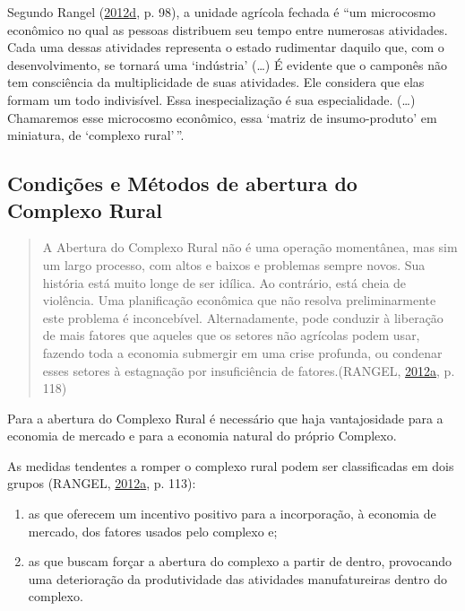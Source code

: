 \documentclass[a4paper, 12pt]{article}
\begin{document}
Segundo Rangel
(\protect\hyperlink{ref-rangel1956}{2012}\protect\hyperlink{ref-rangel1956}{d},
p. 98), a unidade agrícola fechada é ``um microcosmo econômico no qual
as pessoas distribuem seu tempo entre numerosas atividades. Cada uma
dessas atividades representa o estado rudimentar daquilo que, com o
desenvolvimento, se tornará uma `indústria' (\ldots{}) É evidente que o
camponês não tem consciência da multiplicidade de suas atividades. Ele
considera que elas formam um todo indivisível. Essa inespecialização é
sua especialidade. (\ldots{}) Chamaremos esse microcosmo econômico, essa
`matriz de insumo-produto' em miniatura, de `complexo rural'\,''.

\hypertarget{condicoes-e-metodos-de-abertura-do-complexo-rural}{%
\subsection{Condições e Métodos de abertura do Complexo
Rural}\label{condicoes-e-metodos-de-abertura-do-complexo-rural}}

\begin{quote}
A Abertura do Complexo Rural não é uma operação momentânea, mas sim um
largo processo, com altos e baixos e problemas sempre novos. Sua
história está muito longe de ser idílica. Ao contrário, está cheia de
violência. Uma planificação econômica que não resolva preliminarmente
este problema é inconcebível. Alternadamente, pode conduzir à liberação
de mais fatores que aqueles que os setores não agrícolas podem usar,
fazendo toda a economia submergir em uma crise profunda, ou condenar
esses setores à estagnação por insuficiência de fatores.(RANGEL,
\protect\hyperlink{ref-rangel1954}{2012}\protect\hyperlink{ref-rangel1954}{a},
p. 118)
\end{quote}

Para a abertura do Complexo Rural é necessário que haja vantajosidade
para a economia de mercado e para a economia natural do próprio
Complexo.

As medidas tendentes a romper o complexo rural podem ser classificadas
em dois grupos (RANGEL,
\protect\hyperlink{ref-rangel1954}{2012}\protect\hyperlink{ref-rangel1954}{a},
p. 113):

\begin{enumerate}
\def\labelenumi{\alph{enumi}.}
\item
  as que oferecem um incentivo positivo para a incorporação, à economia
  de mercado, dos fatores usados pelo complexo e;
\item
  as que buscam forçar a abertura do complexo a partir de dentro,
  provocando uma deterioração da produtividade das atividades
  manufatureiras dentro do complexo.
\end{enumerate}
\end{document}
